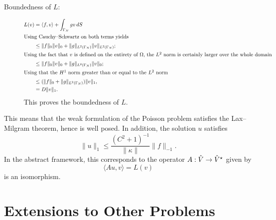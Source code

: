 \begin{description}
    \item[Boundedness of \( L \):]
        \begin{align}
            L(v) &= \langle f, v \rangle + \int_{\Gamma_N} g v\, dS \\
            \shortintertext{Using Cauchy--Schwartz on both terms yields }
                 &\leq \| f\|_0 \| v \|_0 + \| g \|_{L^2(\Gamma_N)} \| v \|_{L^2(\Gamma_N)} ;\\
            \shortintertext{Using the fact that \( v \) is defined on the
            entirety of \( \Omega \), the \( L^2 \) norm is certainly larger
            over the whole domain}
                 &\leq \| f \|_0 \| v \|_0 + \|g\|_{L^2(\Gamma_N)} \| v \|_0;\\
            \shortintertext{Using that the \( H^1 \) norm greater than or equal
            to the \( L^2 \) norm}
                 &\leq (\| f\|_0 + \| g \|_{L^2(\Gamma_N)}) \| v \|_1,\\
                 &= D \| v \|_1.
        \end{align}
        This proves the boundedness of \( L \).
\end{description}
This means that the weak formulation of the Poisson problem satisfies the
Lax--Milgram theorem, hence is well posed. In addition, the solution \( u \)
satisfies
\begin{equation}
    \| u \|_1 \leq \frac{(C^2 + 1)^{-1}}{\|\kappa\|}\| f \|_{-1}.
\end{equation}
In the abstract framework, this corresponds to the operator \( A : \hat{V} \to
\hat{V}^\star \) given by 
\begin{equation}
    \langle Au, v \rangle = L(v)
\end{equation}
is an isomorphism.

\section{Extensions to Other Problems}
\label{sec:extensions_to_other_problems}

